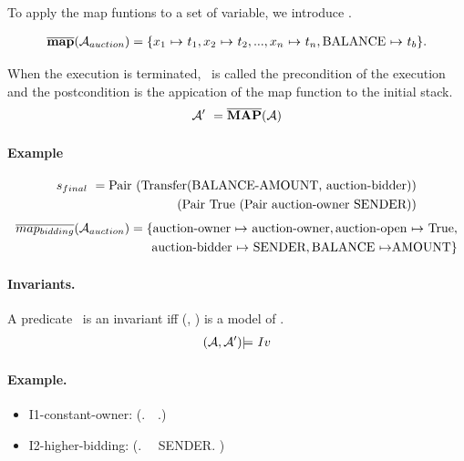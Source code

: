 \documentclass[runningheads]{llncs}
\begin{document}
To apply the map funtions to a set of variable, we introduce \MAPER.

\begin{align*}
\MAPER(\SETAAUCTION) = \{\VariableOne\ \Mapsto\ \TermOne, \VariableTwo\ \Mapsto\ \TermTwo, \DOT, \VariableN\ \Mapsto\ \TermN, \BALANCE\ \Mapsto\ \TermB \}. 
\end{align*}

When the execution is terminated, \PREDICATE\ is called the precondition of the execution and the postcondition is the appication of the map function to the initial stack.
\begin{align*}
\text{$\mathcal{A'}$}\ = \text{$\overline{\textbf{MAP}}$}(\text{$\mathcal{A}$})
\end{align*}

\paragraph{Example}
\begin{align*}
\SFINAL\ = \PAIR\ (\TRANSFER\MinusBalanceAmount\AuctionBidder)\\ (\PAIR\ \TRUE\ (\PAIR\ \AuctionOwner\ \SENDER))
\end{align*}
\begin{align*}
\Overline\MapBidding(\SETAAUCTION) = \{\AuctionOwner\ \Mapsto\ \AuctionOwner, \AuctionOpen\ \Mapsto\ \TRUE, \\ \AuctionBidder\ \Mapsto\ \SENDER, \BALANCE\ \Mapsto \AMOUNT\}
\end{align*}

\paragraph{Invariants.}
\begin{definition}
A predicate \Invariant\ is an invariant  iff (\SETA, \SETPOST) is a model of \Invariant.
\begin{align*}
(\text{$\mathcal{A}$}, \text{$\mathcal{A'}$}) \text{$\models$}\ \text{$Iv$}
\end{align*}
\end{definition}

\paragraph{Example.}
\begin{itemize}
\item[] I1-constant-owner: (\AuctionOwner.\SETPOST\ \EQUAL\ \AuctionOwner.\SETA)
\item[] I2-higher-bidding: (\AuctionBidder. \SETPOST\ \EQUAL\  SENDER. \SETA)
\end{itemize}
\end{document}
